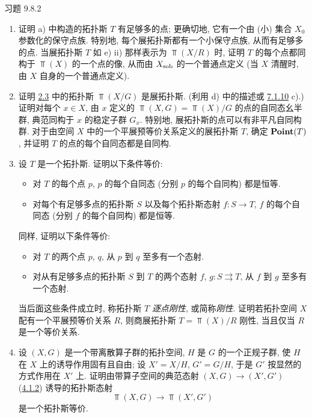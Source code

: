 \begin{enonce*}[remark]{习题 9.8.2}
\begin{enumerate}
此时\pageoriginale 称拓扑斯 $T$ \emph{局部为拓扑空间},
或称为\emph{拓扑展拓扑斯}
(无混淆可能时, 简称\emph{展拓扑斯}).

\item 证明 a) 中构造的拓扑斯 $T$ 有足够多的点;
更确切地, 它有一个由 (小) 集合 $X_0$ 参数化的保守点族.
特别地, 每个展拓扑斯都有一个小保守点族, 从而有足够多的点.
当展拓扑斯 $T$ 如 e) ii) 那样表示为 $\Top(X/R)$ 时,
证明 $T$ 的每个点都同构于 $\Top(X)$ 的一个点的像,
从而由 $X_{\operatorname{sob}}$ 的一个普通点定义
(当 $X$ 清醒时, 由 $X$ 自身的一个普通点定义).

\item 证明 \hyperref[IV.subsec2.3]{2.3} 中的拓扑斯 $\Top(X/G)$ 是展拓扑斯.
(利用 d) 中的描述或 \hyperref[IV.exer7.1.10]{7.1.10} c).)
证明对每个 $x\in X$,
由 $x$ 定义的 $\Top(X,G)=\Top(X)/G$ 的点的自同态幺半群,
典范同构于 $x$ 的稳定子群 $G_x$.
特别地, 展拓扑斯的点可以有非平凡自同构群.
对于由空间 $X$ 中的一个平展预等价关系定义的展拓扑斯 $T$,
确定 $\operatorname{\mathbf{Point}}(T)$,
并证明 $T$ 的点的每个自同态都是自同构.

\item 设 $T$ 是一个拓扑斯. 证明以下条件等价:
\begin{itemize}
\item[i)] 对 $T$ 的每个点 $p$,
$p$ 的每个自同态 (分别 $p$ 的每个自同构) 都是恒等.

\item[ii)] 对每个有足够多点的拓扑斯 $S$
以及每个拓扑斯态射 $f:S\rightarrow T$,
$f$ 的每个自同态 (分别 $f$ 的每个自同构) 都是恒等.
\end{itemize}
同样, 证明以下条件等价:
\begin{itemize}
\item[${\rm i')}$] 对 $T$ 的两个点 $p$, $q$,
从 $p$ 到 $q$ 至多有一个态射.

\item[${\rm ii')}$] 对从有足够多\pageoriginale 点的拓扑斯 $S$ 到 $T$
的两个态射 $f$, $g:S\rightrightarrows T$,
从 $f$ 到 $g$ 至多有一个态射.
\end{itemize}

当后面这些条件成立时,
称拓扑斯 $T$ \emph{逐点刚性}, 或简称\emph{刚性}.
证明若拓扑空间 $X$ 配有一个平展预等价关系 $R$,
则商展拓扑斯 $T=\Top(X)/R$ 刚性,
当且仅当 $R$ 是一个等价关系.

\item 设 $(X,G)$ 是一个带离散算子群的拓扑空间,
$H$ 是 $G$ 的一个正规子群,
使 $H$ 在 $X$ 上的诱导作用固有且自由;
设 $X'=X/H$, $G'=G/H$,
于是 $G'$ 按显然的方式作用在 $X'$ 上.
证明由带算子空间的典范态射 $(X,G)\rightarrow(X',G')$
(\hyperref[IV.subsubsec4.1.2]{4.1.2}) 诱导的拓扑斯态射
$$
\Top(X,G)\longrightarrow \Top(X',G')
$$
是一个拓扑斯等价.


\end{enumerate}
\end{enonce*}
